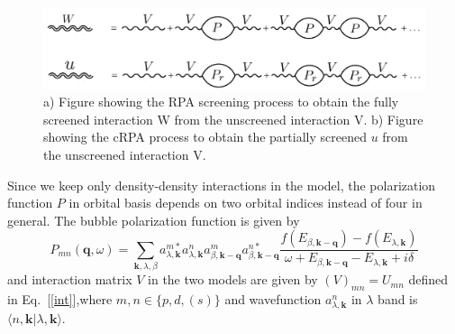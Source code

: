 \documentclass[10pt]{ruthesis}
\begin{document}
{\begin{figure}[H]
 \includegraphics[width=\columnwidth]{./plotForpublishing/RPA.png}
 \caption{\label{RPA} a) Figure showing the RPA screening process to obtain the fully screened interaction W from the unscreened interaction V. b) Figure showing the cRPA process to obtain the partially screened $u$ from the unscreened interaction V.  }
\end{figure}
Since we keep only density-density interactions in the model, the polarization function $P$ in orbital basis depends on two orbital indices instead of four in general. The bubble polarization function is given by
\begin{equation}
P_{mn}(\mathbf q,\omega)=
\sum_{\mathbf k,\lambda,\beta}a^{m*}_{\lambda,\mathbf k}a^n_{\lambda,\mathbf k}a^{m}_{\beta,\mathbf{k-q}}a^{n*}_{\beta,\mathbf{k-q}}\frac{f(E_{\beta,\mathbf{k-q}})-f(E_{\lambda,\mathbf k})}{\omega+E_{\beta,\mathbf{k-q}}-E_{\lambda,\mathbf k}+i\delta}\label{polarzationeq}
\end{equation}
and interaction matrix $V$ in the two models are given by $(V)_{mn}=U_{mn}$ defined in Eq.~[\ref{int}],where $m,n\in\{p,d,(s)\}$ and wavefunction $a^n_{\lambda,\mathbf k}$ in $\lambda$ band is $\langle n,\mathbf k|\lambda,\mathbf k\rangle$.\\

}
\end{document}
